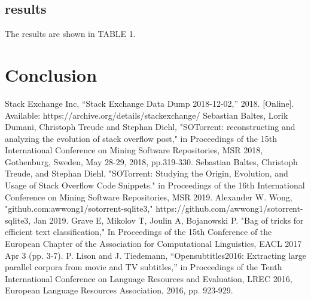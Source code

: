 \documentclass[conference]{IEEEtran}
\begin{document}
\subsection{results}
The results are shown in TABLE 1. 



\section{Conclusion}



\begin{thebibliography}{00}
Stack Exchange Inc, “Stack Exchange Data Dump 2018-12-02,” 2018.
[Online]. Available: https://archive.org/details/stackexchange/
 Sebastian Baltes, Lorik Dumani, Christoph Treude and Stephan Diehl, "SOTorrent: reconstructing and analyzing the evolution of stack overflow post," in Proceedings of the 15th International Conference on Mining Software Repositories, MSR 2018, Gothenburg, Sweden, May 28-29, 2018, pp.319-330.
 Sebastian Baltes, Christoph Treude, and Stephan Diehl, "SOTorrent: Studying the Origin, Evolution, and Usage of Stack Overflow Code Snippets." in Proceedings of the 16th International Conference on Mining Software Repositories, MSR 2019.
 Alexander W. Wong, "github.com:awwong1/sotorrent-sqlite3," https://github.com/awwong1/sotorrent-sqlite3, Jan 2019.
  Grave E, Mikolov T, Joulin A, Bojanowski P. "Bag of tricks for efficient text classification," In Proceedings of the 15th Conference of the European Chapter of the Association for Computational Linguistics, EACL 2017 Apr 3 (pp. 3-7).
 P. Lison and J. Tiedemann, “Opensubtitles2016: Extracting large parallel corpora from movie and TV subtitles,” in Proceedings of the Tenth International Conference on Language Resources and Evaluation, LREC 2016, European Language Resources Association, 2016, pp. 923-929. 


\end{thebibliography}
\end{document}
